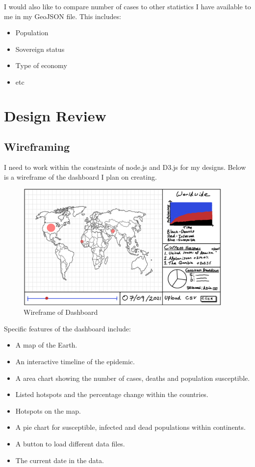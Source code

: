 \documentclass{report}
\begin{document}
I would also like to compare number of cases to other statistics I have available to me in my GeoJSON file. This includes:
\begin{itemize}
    \item Population
    \item Sovereign status
    \item Type of economy
    \item etc
\end{itemize}

\newpage
\chapter{Design Review}
\section{Wireframing}
I need to work within the constraints of node.js and D3.js for my designs. Below is a wireframe of the dashboard I plan on creating.\\
\begin{center}
    \begin{figure}[h]
        \centering
        \includegraphics[width=0.95\textwidth]{Images/Home_Wireframe.png}
        \caption{Wireframe of Dashboard}
        \label{fig:wireframe_world}
    \end{figure}
\end{center}
Specific features of the dashboard include:
\begin{itemize}
    \item A map of the Earth.
    \item An interactive timeline of the epidemic.
    \item A area chart showing the number of cases, deaths and population susceptible.
    \item Listed hotspots and the percentage change within the countries.
    \item Hotspots on the map.
    \item A pie chart for susceptible, infected and dead populations within continents.
    \item A button to load different data files.
    \item The current date in the data.
\end{itemize}
\end{document}
